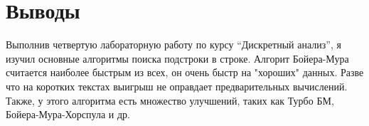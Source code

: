 \section{Выводы}


Выполнив четвертую лабораторную работу по курсу \enquote{Дискретный анализ}, я изучил основные алгоритмы поиска подстроки в строке. Алгорит Бойера-Мура считается наиболее быстрым из всех, он очень быстр на "хороших" данных. Разве что на коротких текстах выигрыш не оправдает предварительных вычислений. Также, у этого алгоритма есть множество улучшений, таких как Турбо БМ, Бойера-Мура-Хорспула и др.
\pagebreak